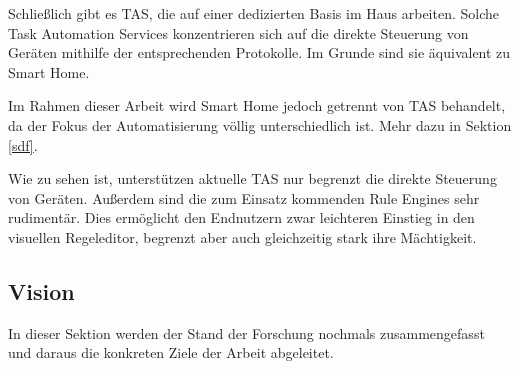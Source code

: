 \documentclass[12pt]{article}
\begin{document}
Schließlich gibt es TAS, die auf einer dedizierten Basis im Haus arbeiten. Solche Task Automation Services konzentrieren sich auf die direkte Steuerung von Geräten mithilfe der entsprechenden Protokolle. Im Grunde sind sie äquivalent zu Smart Home. 

Im Rahmen dieser Arbeit wird Smart Home jedoch getrennt von TAS behandelt, da der Fokus der Automatisierung völlig unterschiedlich ist. Mehr dazu in Sektion \ref{sdf}.

Wie zu sehen ist, unterstützen aktuelle TAS nur begrenzt die direkte Steuerung von Geräten. Außerdem sind die zum Einsatz kommenden Rule Engines sehr rudimentär. Dies ermöglicht den Endnutzern zwar leichteren Einstieg in den visuellen Regeleditor, begrenzt aber auch gleichzeitig stark ihre Mächtigkeit. 










\subsection{Vision}
\label{Vision}
In dieser Sektion werden der Stand der Forschung nochmals zusammengefasst und daraus die konkreten Ziele der Arbeit abgeleitet.
\end{document}
